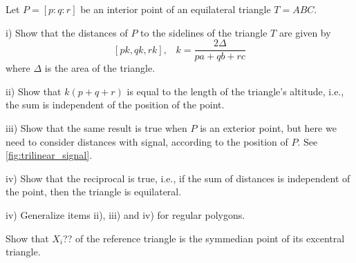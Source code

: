\begin{exercise}\label{ex:1chap1}
Let $P=[p:q:r] $ be an interior point of an equilateral triangle $T=ABC$.

\noindent i) Show that the distances of $P$ to the sidelines of the triangle $T$ are given by
\[ [pk,qk,rk], \;\;\;k=\frac{2\Delta}{pa+qb+rc}\]
where $\Delta$ is the area of the triangle.

 \noindent ii)
 Show that  $k(p+q+r)$ is equal to the length of the triangle's altitude, i.e., the sum is independent of the position of the point.
 
 \noindent iii) Show that the same result is true when $P$ is an exterior point, but here we need to consider distances with signal, according to the position of $P$. See \cref{fig:trilinear_signal}.
 
 \noindent iv) Show that the reciprocal is true, i.e., if the sum of distances is independent of the point, then the triangle is equilateral.
 
 \noindent iv) Generalize items ii), iii) and iv)  for regular polygons.
 \end{exercise}
 
 \begin{exercise}\label{ex:2chap1} Show that $X_i$??  of the reference triangle    is the symmedian point of its excentral triangle.
 
  \end{exercise}
 
  \begin{exercise}\label{ex:3chap1}
  
   \end{exercise}
  
   \begin{exercise}\label{ex:4chap1}
   
    \end{exercise}
   
      \begin{exercise}\label{ex:5chap1}
   
    \end{exercise}